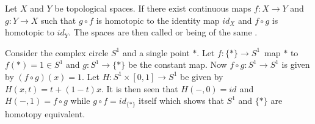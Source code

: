 \documentclass[../../main.tex]{subfiles}
\begin{document}
    \begin{definition}
        Let $X$ and $Y$ be topological spaces. If there exist continuous maps $f : X \to Y$ and $g : Y \to X$ such that $g \circ f$ is homotopic to the identity map $id_X$ and $f \circ g$ is homotopic to $id_Y$. The spaces are then called  or being of the same .
    \end{definition}

    \begin{example}
        Consider the complex circle $S^1$ and a single point $*$. Let $f: \{*\} \to S^1$ map $*$ to $f(*) = 1 \in S^1$ and $g: S^1 \to \{*\}$ be the constant map. Now $f \circ g: S^1 \to S^1$ is given by $(f \circ g)(x) = 1$. Let $H: S^1 \times [0, 1] \to S^1$ be given by $H(x, t) = t + (1-t)x$. It is then seen that $H(-, 0) = id_{}$ and $H(-, 1) = f \circ g$ while $g \circ f = id_{\{*\}}$ itself which shows that $S^1$ and $\{*\}$ are homotopy equivalent.
    \end{example}
\end{document}
